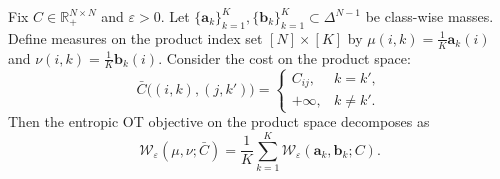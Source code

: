 \begin{theorem}
\label{thm:block_equiv}
Fix $C\in\mathbb{R}_+^{N \times N}$ and $\varepsilon>0$. Let $\{\mathbf{a}_k\}_{k=1}^{K},\{\mathbf{b}_k\}_{k=1}^{K}\subset \Delta^{N-1}$ be class-wise masses. Define measures on the product index set $[N]\times[K]$ by $\mu(i,k)=\frac{1}{K}\mathbf{a}_k(i)$ and $\nu(i,k)=\frac{1}{K}\mathbf{b}_k(i)$. Consider the cost on the product space:
\begin{equation}
\bar{C}\big((i,k),(j,k')\big)=
\begin{cases}
C_{ij}, & k=k',\\
+\infty, & k\neq k'.
\end{cases}
\end{equation}
Then the entropic OT objective on the product space decomposes as
\begin{equation}
\mathcal{W}_{\varepsilon}(\mu,\nu;\bar{C})
=
\frac{1}{K}\sum_{k=1}^{K}\mathcal{W}_{\varepsilon}(\mathbf{a}_k,\mathbf{b}_k;C).
\end{equation}
\end{theorem}

